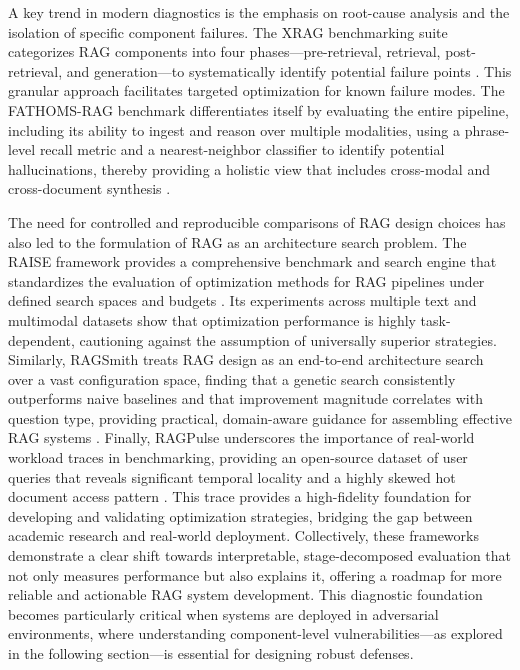 \documentclass[11pt]{article}
\begin{document}
A key trend in modern diagnostics is the emphasis on root-cause analysis and the isolation of specific component failures. The XRAG benchmarking suite categorizes RAG components into four phases---pre-retrieval, retrieval, post-retrieval, and generation---to systematically identify potential failure points \cite{ref421}. This granular approach facilitates targeted optimization for known failure modes. The FATHOMS-RAG benchmark differentiates itself by evaluating the entire pipeline, including its ability to ingest and reason over multiple modalities, using a phrase-level recall metric and a nearest-neighbor classifier to identify potential hallucinations, thereby providing a holistic view that includes cross-modal and cross-document synthesis \cite{ref422}.

The need for controlled and reproducible comparisons of RAG design choices has also led to the formulation of RAG as an architecture search problem. The RAISE framework provides a comprehensive benchmark and search engine that standardizes the evaluation of optimization methods for RAG pipelines under defined search spaces and budgets \cite{ref144}. Its experiments across multiple text and multimodal datasets show that optimization performance is highly task-dependent, cautioning against the assumption of universally superior strategies. Similarly, RAGSmith treats RAG design as an end-to-end architecture search over a vast configuration space, finding that a genetic search consistently outperforms naive baselines and that improvement magnitude correlates with question type, providing practical, domain-aware guidance for assembling effective RAG systems \cite{ref145}. Finally, RAGPulse underscores the importance of real-world workload traces in benchmarking, providing an open-source dataset of user queries that reveals significant temporal locality and a highly skewed hot document access pattern \cite{ref63}. This trace provides a high-fidelity foundation for developing and validating optimization strategies, bridging the gap between academic research and real-world deployment. Collectively, these frameworks demonstrate a clear shift towards interpretable, stage-decomposed evaluation that not only measures performance but also explains it, offering a roadmap for more reliable and actionable RAG system development. This diagnostic foundation becomes particularly critical when systems are deployed in adversarial environments, where understanding component-level vulnerabilities---as explored in the following section---is essential for designing robust defenses.
\end{document}
